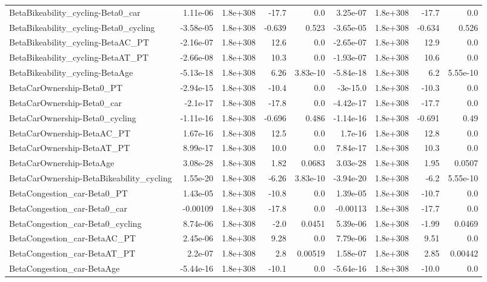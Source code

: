 \begin{tabular}{lrrrrrrrr}
BetaBikeability_cycling-Beta0_car & 1.11e-06 & 1.8e+308 & -17.7 & 0.0 & 3.25e-07 & 1.8e+308 & -17.7 & 0.0 \\
BetaBikeability_cycling-Beta0_cycling & -3.58e-05 & 1.8e+308 & -0.639 & 0.523 & -3.65e-05 & 1.8e+308 & -0.634 & 0.526 \\
BetaBikeability_cycling-BetaAC_PT & -2.16e-07 & 1.8e+308 & 12.6 & 0.0 & -2.65e-07 & 1.8e+308 & 12.9 & 0.0 \\
BetaBikeability_cycling-BetaAT_PT & -2.66e-08 & 1.8e+308 & 10.3 & 0.0 & -1.93e-07 & 1.8e+308 & 10.6 & 0.0 \\
BetaBikeability_cycling-BetaAge & -5.13e-18 & 1.8e+308 & 6.26 & 3.83e-10 & -5.84e-18 & 1.8e+308 & 6.2 & 5.55e-10 \\
BetaCarOwnership-Beta0_PT & -2.94e-15 & 1.8e+308 & -10.4 & 0.0 & -3e-15.0 & 1.8e+308 & -10.3 & 0.0 \\
BetaCarOwnership-Beta0_car & -2.1e-17 & 1.8e+308 & -17.8 & 0.0 & -4.42e-17 & 1.8e+308 & -17.7 & 0.0 \\
BetaCarOwnership-Beta0_cycling & -1.11e-16 & 1.8e+308 & -0.696 & 0.486 & -1.14e-16 & 1.8e+308 & -0.691 & 0.49 \\
BetaCarOwnership-BetaAC_PT & 1.67e-16 & 1.8e+308 & 12.5 & 0.0 & 1.7e-16 & 1.8e+308 & 12.8 & 0.0 \\
BetaCarOwnership-BetaAT_PT & 8.99e-17 & 1.8e+308 & 10.0 & 0.0 & 7.84e-17 & 1.8e+308 & 10.3 & 0.0 \\
BetaCarOwnership-BetaAge & 3.08e-28 & 1.8e+308 & 1.82 & 0.0683 & 3.03e-28 & 1.8e+308 & 1.95 & 0.0507 \\
BetaCarOwnership-BetaBikeability_cycling & 1.55e-20 & 1.8e+308 & -6.26 & 3.83e-10 & -3.94e-20 & 1.8e+308 & -6.2 & 5.55e-10 \\
BetaCongestion_car-Beta0_PT & 1.43e-05 & 1.8e+308 & -10.8 & 0.0 & 1.39e-05 & 1.8e+308 & -10.7 & 0.0 \\
BetaCongestion_car-Beta0_car & -0.00109 & 1.8e+308 & -17.8 & 0.0 & -0.00113 & 1.8e+308 & -17.7 & 0.0 \\
BetaCongestion_car-Beta0_cycling & 8.74e-06 & 1.8e+308 & -2.0 & 0.0451 & 5.39e-06 & 1.8e+308 & -1.99 & 0.0469 \\
BetaCongestion_car-BetaAC_PT & 2.45e-06 & 1.8e+308 & 9.28 & 0.0 & 7.79e-06 & 1.8e+308 & 9.51 & 0.0 \\
BetaCongestion_car-BetaAT_PT & 2.2e-07 & 1.8e+308 & 2.8 & 0.00519 & 1.58e-07 & 1.8e+308 & 2.85 & 0.00442 \\
BetaCongestion_car-BetaAge & -5.44e-16 & 1.8e+308 & -10.1 & 0.0 & -5.64e-16 & 1.8e+308 & -10.0 & 0.0 \\

\end{tabular}
